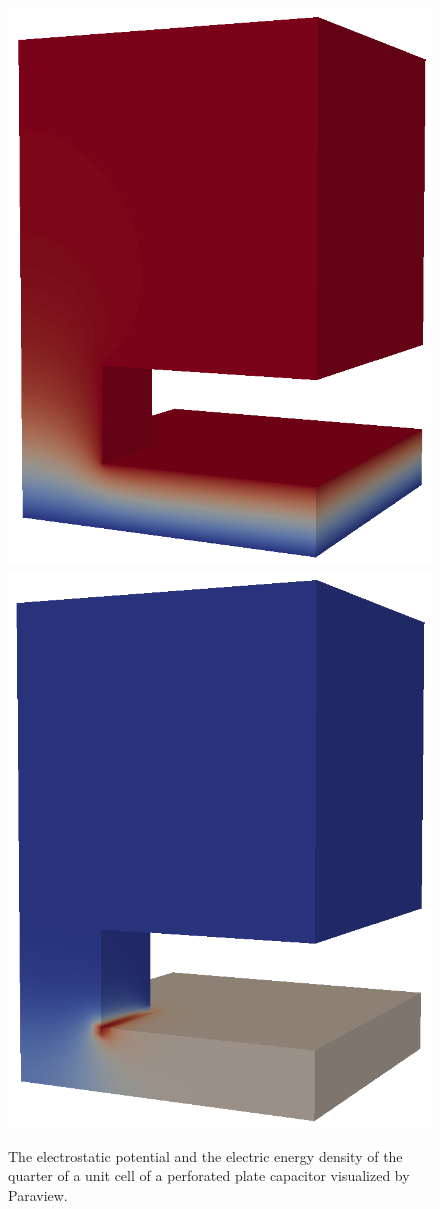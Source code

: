 \begin{figure}[h]
\centering
\includegraphics[width=70 mm]{HexholePotential}
\includegraphics[width=70 mm]{HexholeEnergyDensity}
\caption{The electrostatic potential and the electric energy density of the quarter of  a unit cell of 
a perforated plate capacitor visualized by Paraview.}
\label{fig:hexhole_pot}
\end{figure}  

